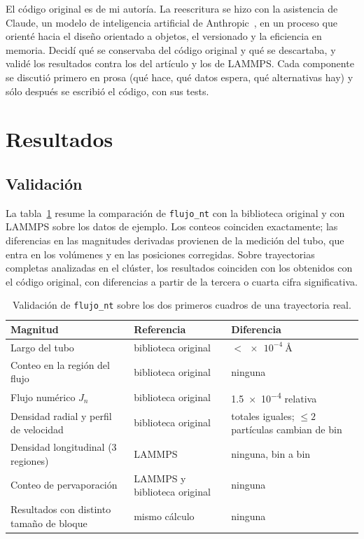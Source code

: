 \documentclass[11pt,a4paper]{article}
\newcommand{\paquete}{\texttt{flujo\_nt}}
\begin{document}
El código original es de mi autoría. La reescritura se hizo con la
asistencia de Claude, un modelo de inteligencia artificial de
Anthropic~\cite{claude}, en un proceso que orienté hacia el diseño orientado
a objetos, el versionado y la eficiencia en memoria. Decidí qué se conservaba
del código original y qué se descartaba, y validé los resultados contra los
del artículo y los de LAMMPS. Cada componente se discutió primero en prosa
(qué hace, qué datos espera, qué alternativas hay) y sólo después se
escribió el código, con sus tests.

\section{Resultados}

\subsection{Validación}

La tabla~\ref{tab:validacion} resume la comparación de \paquete{} con la
biblioteca original y con LAMMPS sobre los datos de ejemplo. Los conteos
coinciden exactamente; las diferencias en las magnitudes derivadas provienen
de la medición del tubo, que entra en los volúmenes y en las posiciones
corregidas. Sobre trayectorias completas analizadas en el clúster, los
resultados coinciden con los obtenidos con el código original, con
diferencias a partir de la tercera o cuarta cifra significativa.

\begin{table}[tb]
\centering
\small
\begin{tabular}{p{}p{}p{}}
    \toprule
    Magnitud & Referencia & Diferencia \\
    \midrule
    Largo del tubo & biblioteca original & $< \SI{e-4}{\angstrom}$ \\
    Conteo en la región del flujo & biblioteca original & ninguna \\
    Flujo numérico $J_n$ & biblioteca original & \num{1.5e-4} relativa \\
    Densidad radial y perfil de velocidad & biblioteca original &
        totales iguales; $\leq 2$ partículas cambian de bin \\
    Densidad longitudinal (3 regiones) & LAMMPS & ninguna, bin a bin \\
    Conteo de pervaporación & LAMMPS y biblioteca original & ninguna \\
    Resultados con distinto tamaño de bloque & mismo cálculo & ninguna \\
    \bottomrule
\end{tabular}
\caption{Validación de \paquete{} sobre los dos primeros cuadros de una
trayectoria real.}
\label{tab:validacion}
\end{table}
\end{document}
